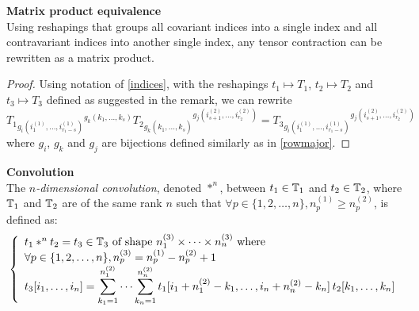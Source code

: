 \begin{proposition}\textbf{Matrix product equivalence}\\
Using reshapings that groups all covariant indices into a single index and all contravariant indices into another single index, any tensor contraction can be rewritten as a matrix product.
\label{prop:matprodeq}
\end{proposition}
\begin{proof}
Using notation of \eqref{indices}, with the reshapings $t_1 \mapsto T_1$, $t_2 \mapsto T_2$ and $t_3 \mapsto T_3$ defined as suggested in the remark, we can rewrite
$$
T_1 \hspace{0pt}_{g_i(i_1^{(1)}, \ldots, i_{r_1-s}^{(1)})} \hspace{0pt}^{g_k(k_1, \ldots, k_s)} 
T_2 \hspace{0pt}_{g_k(k_1^{\phantom{(}}, \ldots, k_s^{\phantom{(}})} \hspace{0pt}^{g_j(i_{s+1}^{(2)}, \ldots, i_{r_2}^{(2)})} =
T_3 \hspace{0pt}_ {g_i(i_1^{(1)}, \ldots, i_{r_1-s}^{(1)})} \hspace{0pt}^{g_j(i_{s+1}^{(2)}, \ldots, i_{r_2}^{(2)})}
$$
where $g_i$, $g_k$ and $g_j$ are bijections defined similarly as in \eqref{rowmajor}.
\end{proof}

\begin{definition}\textbf{Convolution}\\
The \emph{$n$-dimensional convolution}, denoted $\ast^n$, between $t_1 \in \mathbb{T}_1$ and $t_2 \in \mathbb{T}_2$, where $\mathbb{T}_1$ and $\mathbb{T}_2$ are of the same rank $n$ such that $\forall p \in \{1, 2, \ldots, n\}, n_p^{(1)} \ge n_p^{(2)}$, is defined as:
\begin{gather*}
\left\{
  \begin{array}{l}
    t_1 \ast^n t_2 = t_3 \in  \mathbb{T}_3 \text{ of shape } n_1^{(3)} \times \cdots \times n_n^{(3)}
    \text{ where} \\
    \forall p \in \{1, 2, \ldots, n\}, n_p^{(3)} = n_p^{(1)} - n_p^{(2)} + 1 \\
    t_3[i_1, \ldots, i_n] =
    \displaystyle \sum_{k_1=1}^{n_1^{(2)}} \cdots \sum_{k_n=1}^{n_n^{(2)}}
    t_1[i_1 + n_1^{(2)} - k_1, \ldots, i_n + n_n^{(2)} - k_n] \hspace{2pt} t_2[k_1, \ldots, k_n] \\
  \end{array}
\right.
\end{gather*}
\label{def:convdef}
\end{definition}

